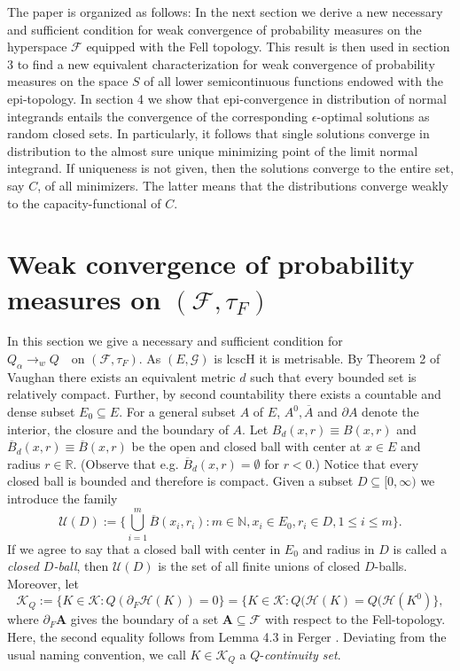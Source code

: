 \documentclass[sn-mathphys,Numbered]{sn-jnl}%
\theoremstyle{thmstyleone}%
\theoremstyle{thmstyletwo}%
\theoremstyle{thmstylethree}%
\begin{document}
The paper is organized as follows: In the next section we derive a new necessary and sufficient condition for weak convergence of probability measures on the hyperspace $\mathcal{F}$ equipped with the Fell topology. This result is then used in section 3 to find a new equivalent characterization for weak convergence
of probability measures on the space $S$ of all lower semicontinuous functions endowed with the epi-topology. In section 4 we show that epi-convergence in distribution of normal integrands entails the convergence of the corresponding $\epsilon$-optimal solutions as random closed sets.
In particularly, it follows that single solutions converge in distribution to the almost sure unique minimizing point of the limit normal integrand.
If uniqueness is not given, then the solutions converge to the entire set, say $C$, of all minimizers. The latter means that the distributions converge weakly to the capacity-functional of $C$.


\section{Weak convergence of probability measures on $(\mathcal{F},\tau_F)$}
In this section we give a necessary and sufficient condition for $Q_\alpha \longrightarrow_w Q \quad \text{on } (\mathcal{F},\tau_F)$.
As $(E,\mathcal{G})$ is lcscH it is metrisable. By Theorem 2 of Vaughan \cite{Vaughan} there exists an equivalent metric $d$ such that
every bounded set is relatively compact. Further, by second countability there exists a countable and dense subset $E_0 \subseteq E$.
For a general subset $A$ of $E$, $A^0, \overline{A}$ and  $\partial A$ denote the interior, the closure
and the boundary of $A$. Let $B_d(x,r) \equiv B(x,r)$ and $\overline{B}_d(x,r) \equiv \overline{B}(x,r)$ be the open and closed ball with center at $x \in E$ and
radius $r \in \mathbb{R}$. (Observe that e.g. $\overline{B}_d(x,r) = \emptyset$ for $r<0$.) Notice that every closed ball is bounded and therefore is compact.
Given a subset $D \subseteq [0,\infty)$ we introduce the family
\begin{equation} \label{fub}
 \mathcal{U}(D):= \{ \bigcup_{i=1}^m \overline{B}(x_i,r_i): m \in \mathbb{N}, x_i \in E_0, r_i \in D, 1 \le i \le m\}.
\end{equation}
If we agree to say that a closed ball with center in $E_0$ and radius in $D$ is called a \emph{closed $D$-ball}, then
$\mathcal{U}(D)$ is the set of all finite unions of closed $D$-balls. Moreover, let
\begin{equation} \label{Q-continuityset}
 \mathcal{K}_Q:=\{K \in \mathcal{K}: Q(\partial_F \mathcal{H}(K))=0\}=\{K \in \mathcal{K}: Q(\mathcal{H}(K)=Q(\mathcal{H}(K^0)\},
\end{equation}
where $\partial_F \textbf{A}$ gives the boundary of a set $\textbf{A} \subseteq \mathcal{F}$ with respect to the Fell-topology. Here, the
second equality follows from Lemma 4.3 in Ferger \cite{Ferger2}.
Deviating from the usual naming convention, we call $K \in \mathcal{K}_Q$ a $Q$-\emph{continuity set}.\\
\end{document}
